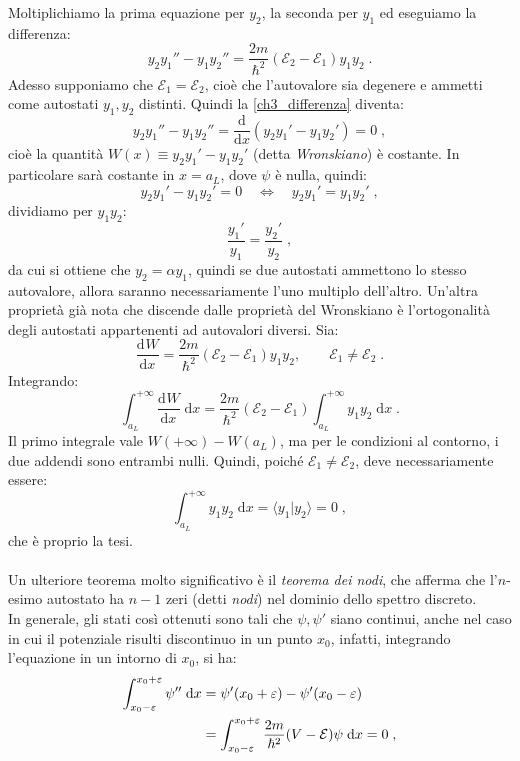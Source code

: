 \documentclass[10pt,a4paper]{report}
\theoremstyle{definition}
\newcommand{\dev}[3][]{\frac{\mathrm{d}^{#1} #2}{\mathrm{d} #3^{#1}}}
\numberwithin{equation}{section}
\newcommand{\diff}[1][]{\mathrm{d}#1}
\newcommand{\bra}{\langle}
\newcommand{\ket}{\rangle}
\begin{document}
Moltiplichiamo la prima equazione per $y_2$, la seconda per $y_1$ ed eseguiamo la differenza:
\begin{equation}
y_2y_1''-y_1y_2''=\frac{2m}{\hbar^2}(\mathcal{E}_2-\mathcal{E}_1)y_1y_2\;. \label{ch3_differenza}
\end{equation}
Adesso supponiamo che $\mathcal{E}_1=\mathcal{E}_2$, cioè che l'autovalore sia degenere e ammetti come autostati $y_1,y_2$ distinti. Quindi la \eqref{ch3_differenza} diventa:
\begin{equation}
y_2y_1''-y_1y_2''=\frac{\mathrm{d}}{\diff{x}}(y_2y_1'-y_1y_2')=0\;,
\end{equation}
cioè la quantità $W(x)\equiv y_2y_1'-y_1y_2'$ (detta \textit{Wronskiano}) è costante. In particolare sarà costante in $x=a_L$, dove $\psi$ è nulla, quindi:
$$
y_2y_1'-y_1y_2'=0\quad \Longleftrightarrow \quad y_2y_1'=y_1y_2'\;,
$$
dividiamo per $y_1y_2$:
$$
\frac{y_1'}{y_1}=\frac{y_2'}{y_2}\;,
$$
da cui si ottiene che $y_2=\alpha y_1$, quindi se due autostati ammettono lo stesso autovalore, allora saranno necessariamente l'uno multiplo dell'altro. Un'altra proprietà già nota che discende dalle proprietà del Wronskiano è l'ortogonalità degli autostati appartenenti ad autovalori diversi. Sia:
$$
\dev{W}{x}=\frac{2m}{\hbar^2}(\mathcal{E}_2-\mathcal{E}_1)y_1y_2,\qquad \mathcal{E}_1\ne\mathcal{E}_2\;.
$$
Integrando:
\begin{equation}
\int_{a_L}^{+\infty}\dev{W}{x}\;\diff{x}=\frac{2m}{\hbar^2}(\mathcal{E}_2-\mathcal{E}_1)\int_{a_L}^{+\infty} y_1y_2\;\diff{x}\;.
\end{equation}
Il primo integrale vale $W(+\infty)-W(a_L)$, ma per le condizioni al contorno, i due addendi sono entrambi nulli. Quindi, poiché $\mathcal{E}_1\ne\mathcal{E}_2$, deve necessariamente essere:
\begin{equation}
\int_{a_L}^{+\infty} y_1y_2\;\diff{x}=\bra y_1|y_2\ket=0\;,
\end{equation}
che è proprio la tesi. \\
\\
Un ulteriore teorema molto significativo è il \textit{teorema dei nodi}, che afferma che l'$n$-esimo autostato ha $n-1$ zeri (detti \textit{nodi}) nel dominio dello spettro discreto. \\
In generale, gli stati così ottenuti sono tali che $\psi,\psi'$ siano continui, anche nel caso in cui il potenziale risulti discontinuo in un punto $x_0$, infatti, integrando l'equazione in un intorno di $x_0$, si ha:
\begin{align}
\int_{x_0-\varepsilon}^{x_0+\varepsilon} \psi''\;\diff{x} &= \psi'(x_0+\varepsilon)-\psi'(x_0-\varepsilon) \notag \\
&= \int_{x_0-\varepsilon}^{x_0+\varepsilon} \frac{2m}{\hbar^2}(V-\mathcal{E})\psi\;\diff{x}=0\;,
\end{align}
\end{document}
